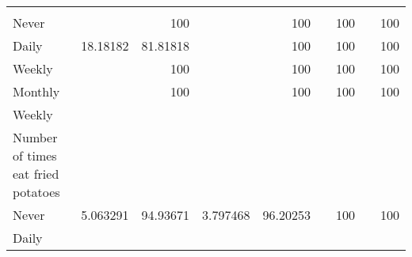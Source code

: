 \documentclass{article}
\begin{document}
\begin{tabular}{lllllllll}
  \multicolumn{1}{r}{} &
  \multicolumn{1}{r}{} &
  \multicolumn{1}{r}{} &
  \multicolumn{1}{r}{} \\
\multicolumn{1}{l}{\hspace{7em}Never} &
  \multicolumn{1}{|r}{} &
  \multicolumn{1}{r}{100} &
  \multicolumn{1}{r}{} &
  \multicolumn{1}{r}{100} &
  \multicolumn{1}{r}{} &
  \multicolumn{1}{r}{100} &
  \multicolumn{1}{r}{} &
  \multicolumn{1}{r}{100} \\
\multicolumn{1}{l}{\hspace{7em}Daily} &
  \multicolumn{1}{|r}{18.18182} &
  \multicolumn{1}{r}{81.81818} &
  \multicolumn{1}{r}{} &
  \multicolumn{1}{r}{100} &
  \multicolumn{1}{r}{} &
  \multicolumn{1}{r}{100} &
  \multicolumn{1}{r}{} &
  \multicolumn{1}{r}{100} \\
\multicolumn{1}{l}{\hspace{7em}Weekly} &
  \multicolumn{1}{|r}{} &
  \multicolumn{1}{r}{100} &
  \multicolumn{1}{r}{} &
  \multicolumn{1}{r}{100} &
  \multicolumn{1}{r}{} &
  \multicolumn{1}{r}{100} &
  \multicolumn{1}{r}{} &
  \multicolumn{1}{r}{100} \\
\multicolumn{1}{l}{\hspace{7em}Monthly} &
  \multicolumn{1}{|r}{} &
  \multicolumn{1}{r}{100} &
  \multicolumn{1}{r}{} &
  \multicolumn{1}{r}{100} &
  \multicolumn{1}{r}{} &
  \multicolumn{1}{r}{100} &
  \multicolumn{1}{r}{} &
  \multicolumn{1}{r}{100} \\
\multicolumn{1}{l}{\hspace{5em}Weekly} &
  \multicolumn{1}{|r}{} &
  \multicolumn{1}{r}{} &
  \multicolumn{1}{r}{} &
  \multicolumn{1}{r}{} &
  \multicolumn{1}{r}{} &
  \multicolumn{1}{r}{} &
  \multicolumn{1}{r}{} &
  \multicolumn{1}{r}{} \\
\multicolumn{1}{l}{\hspace{6em}Number of times eat fried potatoes} &
  \multicolumn{1}{|r}{} &
  \multicolumn{1}{r}{} &
  \multicolumn{1}{r}{} &
  \multicolumn{1}{r}{} &
  \multicolumn{1}{r}{} &
  \multicolumn{1}{r}{} &
  \multicolumn{1}{r}{} &
  \multicolumn{1}{r}{} \\
\multicolumn{1}{l}{\hspace{7em}Never} &
  \multicolumn{1}{|r}{5.063291} &
  \multicolumn{1}{r}{94.93671} &
  \multicolumn{1}{r}{3.797468} &
  \multicolumn{1}{r}{96.20253} &
  \multicolumn{1}{r}{} &
  \multicolumn{1}{r}{100} &
  \multicolumn{1}{r}{} &
  \multicolumn{1}{r}{100} \\
\multicolumn{1}{l}{\hspace{7em}Daily} &

\end{tabular}
\end{document}
